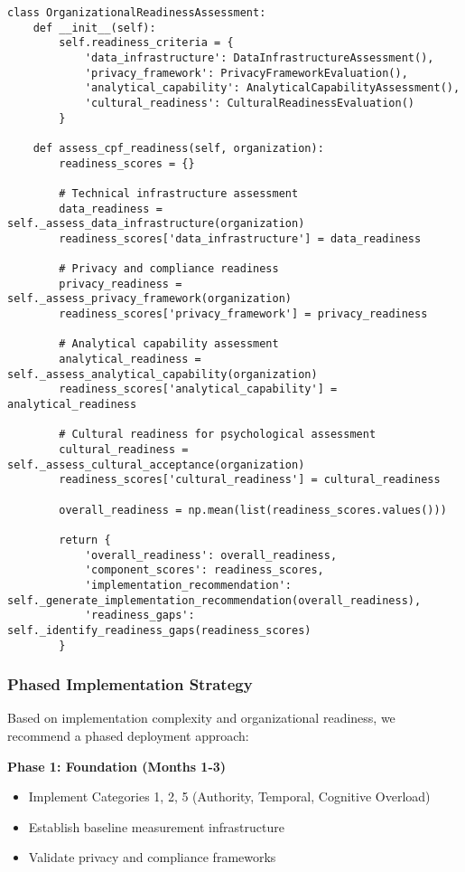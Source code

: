 \documentclass[11pt, onecolumn]{article}
\begin{document}
\begin{lstlisting}
class OrganizationalReadinessAssessment:
    def __init__(self):
        self.readiness_criteria = {
            'data_infrastructure': DataInfrastructureAssessment(),
            'privacy_framework': PrivacyFrameworkEvaluation(),
            'analytical_capability': AnalyticalCapabilityAssessment(),
            'cultural_readiness': CulturalReadinessEvaluation()
        }
        
    def assess_cpf_readiness(self, organization):
        readiness_scores = {}
        
        # Technical infrastructure assessment
        data_readiness = self._assess_data_infrastructure(organization)
        readiness_scores['data_infrastructure'] = data_readiness
        
        # Privacy and compliance readiness
        privacy_readiness = self._assess_privacy_framework(organization)
        readiness_scores['privacy_framework'] = privacy_readiness
        
        # Analytical capability assessment
        analytical_readiness = self._assess_analytical_capability(organization)
        readiness_scores['analytical_capability'] = analytical_readiness
        
        # Cultural readiness for psychological assessment
        cultural_readiness = self._assess_cultural_acceptance(organization)
        readiness_scores['cultural_readiness'] = cultural_readiness
        
        overall_readiness = np.mean(list(readiness_scores.values()))
        
        return {
            'overall_readiness': overall_readiness,
            'component_scores': readiness_scores,
            'implementation_recommendation': self._generate_implementation_recommendation(overall_readiness),
            'readiness_gaps': self._identify_readiness_gaps(readiness_scores)
        }
\end{lstlisting}

\subsubsection{Phased Implementation Strategy}

Based on implementation complexity and organizational readiness, we recommend a phased deployment approach:

\textbf{Phase 1: Foundation (Months 1-3)}
\begin{itemize}
\item Implement Categories 1, 2, 5 (Authority, Temporal, Cognitive Overload)
\item Establish baseline measurement infrastructure
\item Validate privacy and compliance frameworks
\end{itemize}
\end{document}
